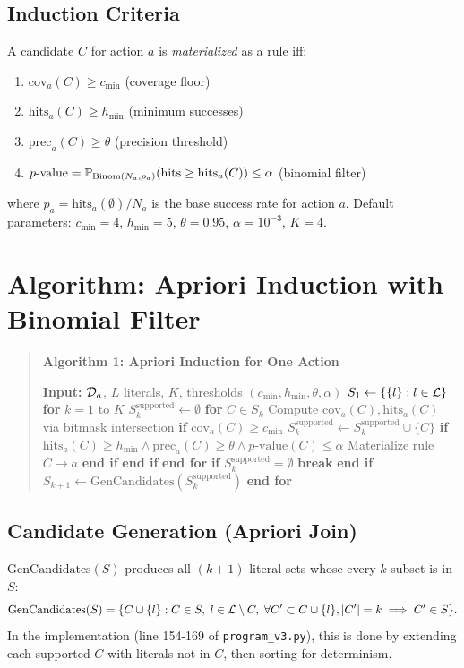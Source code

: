 \subsection{Induction Criteria}
A candidate $C$ for action $a$ is \emph{materialized} as a rule iff:
\begin{enumerate}
    \item $\mathrm{cov}_a(C) \geq c_{\min}$ (coverage floor)
    \item $\mathrm{hits}_a(C) \geq h_{\min}$ (minimum successes)
    \item $\mathrm{prec}_a(C) \geq \theta$ (precision threshold)
    \item $p\text{-value} = \mathbb{P}_{\mathrm{Binom}(N_a, p_a)}(\mathrm{hits} \geq \mathrm{hits}_a(C)) \leq \alpha$ (binomial filter)
\end{enumerate}
where $p_a = \mathrm{hits}_a(\emptyset) / N_a$ is the base success rate for action $a$. Default parameters: $c_{\min}=4$, $h_{\min}=5$, $\theta=0.95$, $\alpha=10^{-3}$, $K=4$.

\section{Algorithm: Apriori Induction with Binomial Filter}

\begin{quote}
\textbf{Algorithm 1: Apriori Induction for One Action}

\textbf{Input:} $\mathcal{D}_a$, $L$ literals, $K$, thresholds $(c_{\min}, h_{\min}, \theta, \alpha)$
$S_1 \gets \{\{l\} : l \in \mathcal{L}\}$ 
\textbf{for} $k = 1$ to $K$
    $S_k^{\text{supported}} \gets \emptyset$
    \textbf{for} $C \in S_k$
        Compute $\mathrm{cov}_a(C), \mathrm{hits}_a(C)$ via bitmask intersection
        \textbf{if} $\mathrm{cov}_a(C) \geq c_{\min}$
            $S_k^{\text{supported}} \gets S_k^{\text{supported}} \cup \{C\}$
            \textbf{if} $\mathrm{hits}_a(C) \geq h_{\min} \land \mathrm{prec}_a(C) \geq \theta \land p\text{-value}(C) \leq \alpha$
                Materialize rule $C \to a$
            \textbf{end if}
        \textbf{end if}
    \textbf{end for}
    \textbf{if} $S_k^{\text{supported}} = \emptyset$ \textbf{break} \textbf{end if}
    $S_{k+1} \gets \mathrm{GenCandidates}(S_k^{\text{supported}})$ 
\textbf{end for}

\end{quote}

\subsection{Candidate Generation (Apriori Join)}
$\mathrm{GenCandidates}(S)$ produces all $(k+1)$-literal sets whose every $k$-subset is in $S$:
\[
\mathrm{GenCandidates}(S) = \{ C \cup \{l\} : C \in S,\; l \in \mathcal{L} \setminus C,\; \forall C' \subset C \cup \{l\}, |C'|=k \implies C' \in S \}.
\]
In the implementation (line 154-169 of \texttt{program\_v3.py}), this is done by extending each supported $C$ with literals not in $C$, then sorting for determinism.

